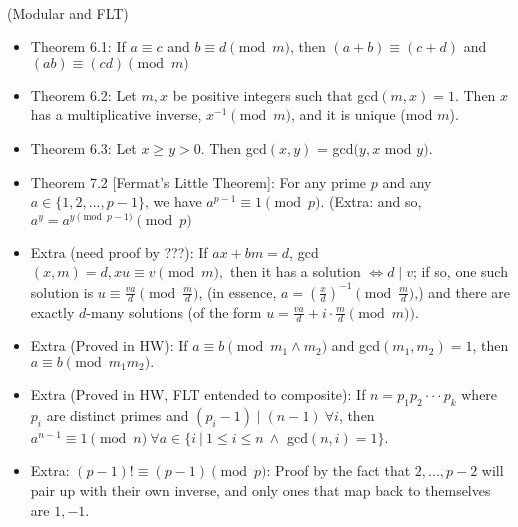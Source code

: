\documentclass{article}
\begin{document}
 \\
(Modular and FLT)
\begin{itemize}
	\item Theorem 6.1: If $a\equiv c$ and $b\equiv d\pmod{m}$, then $(a+b)\equiv(c+d)$ and $(ab)\equiv(cd)\pmod{m}$
	\item Theorem 6.2: Let $m,x$ be positive integers such that gcd$(m,x) = 1$. Then $x$ has a multiplicative inverse, $x^{-1}\pmod{m}$, and it is unique (mod $m$).
	\item Theorem 6.3: Let $x\geq y > 0$. Then gcd$(x, y)$ = gcd$(y, x$ mod $y)$.
	\item Theorem 7.2 [Fermat's Little Theorem]: For any prime $p$ and any $a\in\{1,2,...,p-1\}$, we have $a^{p-1}\equiv1\pmod{p}.$ (Extra: and so, $a^y = a^{y\pmod{p-1}}\pmod{p}$
	\item Extra (need proof by ???): If $ax+bm = d$, gcd$(x,m) = d, xu\equiv v\pmod{m},$ then it has a solution $\iff d\mid v$; if so, one such solution is $u\equiv\frac{va}{d}\pmod{\frac{m}{d}}$, (in essence, $a = (\frac{x}{d})^{-1}\pmod{\frac{m}{d}}$,) and there are exactly {\large$d$}-many solutions (of the form $u = \frac{va}{d} + i\cdot\frac{m}{d}\pmod{m}).$
	\item Extra (Proved in HW): If $a\equiv b\pmod{m_1\land m_2}$ and gcd$(m_1, m_2) = 1$, then $a\equiv b\pmod{m_1m_2}.$
	\item Extra (Proved in HW, FLT entended to composite): If $n = p_1p_2\cdot\cdot\cdot p_k$ where $p_i$ are distinct primes and $(p_i - 1)\mid(n - 1)\ \forall i$, then $a^{n-1}\equiv1\pmod{n}\ \forall a\in\{i\ |\ 1\leq i\leq n\ \land$ gcd$(n,i) = 1\}.$
	\item Extra: $(p-1)!\equiv(p-1)\pmod{p}$: Proof by the fact that $2,...,p-2$ will pair up with their own inverse, and only ones that map back to themselves are $1, -1$.

\end{itemize}
\end{document}
